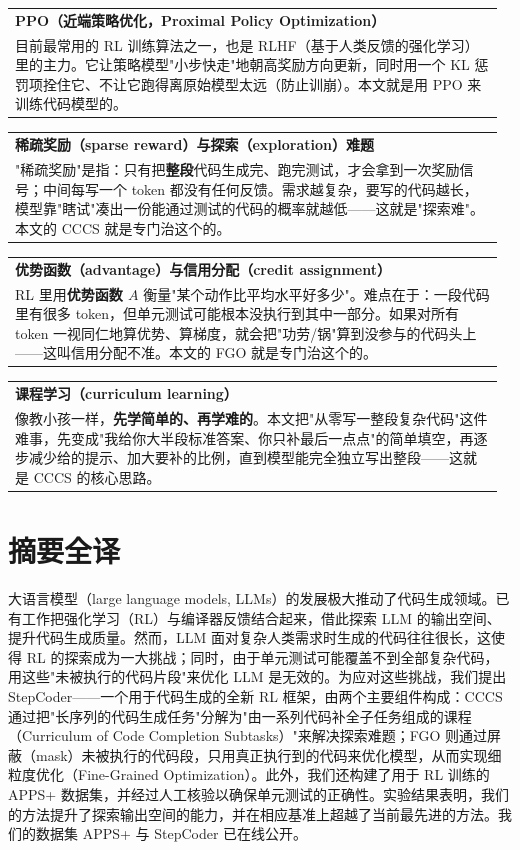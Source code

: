 \documentclass[11pt,UTF8,fontset=fandol]{ctexart}
\makeatletter
\newenvironment{infobox}[1]{%
  \par\medskip\noindent
  \begin{tabular}{@{}p{0.97\linewidth}@{}}
  \hline
  \rule{0pt}{2.4ex}\textbf{#1}\\
}{%
  \\\hline
  \end{tabular}\par\medskip
}
\makeatother
\begin{document}
\begin{infobox}{PPO（近端策略优化，Proximal Policy Optimization）}
目前最常用的 RL 训练算法之一，也是 RLHF（基于人类反馈的强化学习）里的主力。它让策略模型"小步快走"地朝高奖励方向更新，同时用一个 KL 惩罚项拴住它、不让它跑得离原始模型太远（防止训崩）。本文就是用 PPO 来训练代码模型的。
\end{infobox}

\begin{infobox}{稀疏奖励（sparse reward）与探索（exploration）难题}
"稀疏奖励"是指：只有把\textbf{整段}代码生成完、跑完测试，才会拿到一次奖励信号；中间每写一个 token 都没有任何反馈。需求越复杂，要写的代码越长，模型靠"瞎试"凑出一份能通过测试的代码的概率就越低——这就是"探索难"。本文的 CCCS 就是专门治这个的。
\end{infobox}

\begin{infobox}{优势函数（advantage）与信用分配（credit assignment）}
RL 里用\textbf{优势函数 $A$} 衡量"某个动作比平均水平好多少"。难点在于：一段代码里有很多 token，但单元测试可能根本没执行到其中一部分。如果对所有 token 一视同仁地算优势、算梯度，就会把"功劳/锅"算到没参与的代码头上——这叫信用分配不准。本文的 FGO 就是专门治这个的。
\end{infobox}

\begin{infobox}{课程学习（curriculum learning）}
像教小孩一样，\textbf{先学简单的、再学难的}。本文把"从零写一整段复杂代码"这件难事，先变成"我给你大半段标准答案、你只补最后一点点"的简单填空，再逐步减少给的提示、加大要补的比例，直到模型能完全独立写出整段——这就是 CCCS 的核心思路。
\end{infobox}

\section{摘要全译}

大语言模型（large language models, LLMs）的发展极大推动了代码生成领域。已有工作把强化学习（RL）与编译器反馈结合起来，借此探索 LLM 的输出空间、提升代码生成质量。然而，LLM 面对复杂人类需求时生成的代码往往很长，这使得 RL 的探索成为一大挑战；同时，由于单元测试可能覆盖不到全部复杂代码，用这些"未被执行的代码片段"来优化 LLM 是无效的。为应对这些挑战，我们提出 StepCoder——一个用于代码生成的全新 RL 框架，由两个主要组件构成：CCCS 通过把"长序列的代码生成任务"分解为"由一系列代码补全子任务组成的课程（Curriculum of Code Completion Subtasks）"来解决探索难题；FGO 则通过屏蔽（mask）未被执行的代码段，只用真正执行到的代码来优化模型，从而实现细粒度优化（Fine-Grained Optimization）。此外，我们还构建了用于 RL 训练的 APPS+ 数据集，并经过人工核验以确保单元测试的正确性。实验结果表明，我们的方法提升了探索输出空间的能力，并在相应基准上超越了当前最先进的方法。我们的数据集 APPS+ 与 StepCoder 已在线公开。
\end{document}
